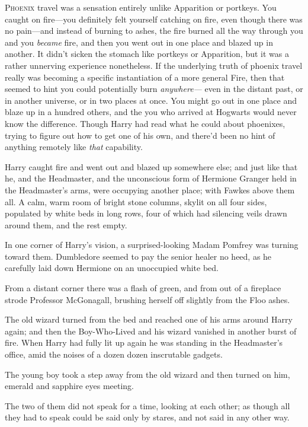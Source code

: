 
\lettrine{P}{hoenix} travel
was a sensation entirely unlike Apparition or portkeys. You caught on
fire—you definitely felt yourself catching on fire, even though there was no
pain—and instead of burning to ashes, the fire burned all the way through you
and you \emph{became} fire, and then you went out in one place and blazed up in
another. It didn’t sicken the stomach like portkeys or Apparition, but it was a
rather unnerving experience nonetheless. If the underlying truth of phoenix
travel really was becoming a specific instantiation of a more general Fire,
then that seemed to hint you could potentially burn \emph{anywhere—} even in
the distant past, or in another universe, or in two places at once. You might
go out in one place and blaze up in a hundred others, and the you who arrived
at Hogwarts would never know the difference. Though Harry had read what he
could about phoenixes, trying to figure out how to get one of his own, and
there’d been no hint of anything remotely like \emph{that} capability.

Harry caught fire and went out and blazed up somewhere else; and just like that
he, and the Headmaster, and the unconscious form of Hermione Granger held in
the Headmaster’s arms, were occupying another place; with Fawkes above them
all. A calm, warm room of bright stone columns, skylit on all four sides,
populated by white beds in long rows, four of which had silencing veils drawn
around them, and the rest empty.

In one corner of Harry’s vision, a surprised-looking Madam Pomfrey was turning
toward them. Dumbledore seemed to pay the senior healer no heed, as he
carefully laid down Hermione on an unoccupied white bed.

From a distant corner there was a flash of green, and from out of a fireplace
strode Professor McGonagall, brushing herself off slightly from the Floo ashes.

The old wizard turned from the bed and reached one of his arms around Harry
again; and then the Boy-Who-Lived and his wizard vanished in another burst of
fire.
\later
When Harry had fully lit up again he was standing in the Headmaster’s office,
amid the noises of a dozen dozen inscrutable gadgets.

The young boy took a step away from the old wizard and then turned on him,
emerald and sapphire eyes meeting.

The two of them did not speak for a time, looking at each other; as though all
they had to speak could be said only by stares, and not said in any other way.

